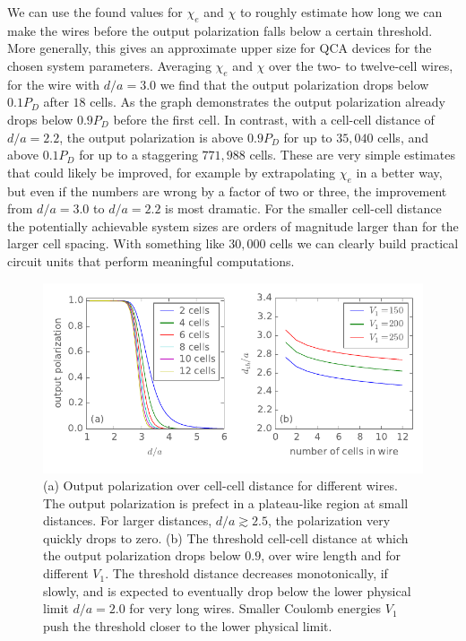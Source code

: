 We can use the found values for $\chi_e$ and $\chi$ to roughly estimate how long
we can make the wires before the output polarization falls below a certain
threshold. More generally, this gives an approximate upper size for QCA devices
for the chosen system parameters. Averaging $\chi_e$ and $\chi$ over the two- to
twelve-cell wires, for the wire with $d/a = 3.0$ we find that the output
polarization drops below $0.1 P_D$ after $18$ cells. As the graph demonstrates the
output polarization already drops below $0.9 P_D$ before the first cell. In
contrast, with a cell-cell distance of $d/a = 2.2$, the output polarization is
above $0.9 P_D$ for up to $35,040$ cells, and above $0.1 P_D$ for up to a
staggering $771,988$ cells. These are very simple estimates that could likely be
improved, for example by extrapolating $\chi_e$ in a better way, but even if the
numbers are wrong by a factor of two or three, the improvement from $d/a = 3.0$
to $d/a = 2.2$ is most dramatic. For the smaller cell-cell distance the
potentially achievable system sizes are orders of magnitude larger than for the
larger cell spacing. With something like $30,000$ cells we can clearly build
practical circuit units that perform meaningful computations.

\begin{figure}
  \center
  \includegraphics{cell_cell_distance_threshold}
  \caption{
  (a) Output polarization over cell-cell distance for different wires. The
  output polarization is prefect in a plateau-like region at small distances.
  For larger distances, $d/a \gtrsim 2.5$, the polarization very quickly drops
  to zero.
  (b) The threshold cell-cell distance at which the output polarization drops
  below $0.9$, over wire length and for different $V_1$. The threshold distance
  decreases monotonically, if slowly, and is expected to eventually drop below
  the lower physical limit $d/a = 2.0$ for very long wires. Smaller Coulomb
  energies $V_1$ push the threshold closer to the lower physical limit.
  }
  \label{fig:cell_cell_distance_threshold}
\end{figure}

